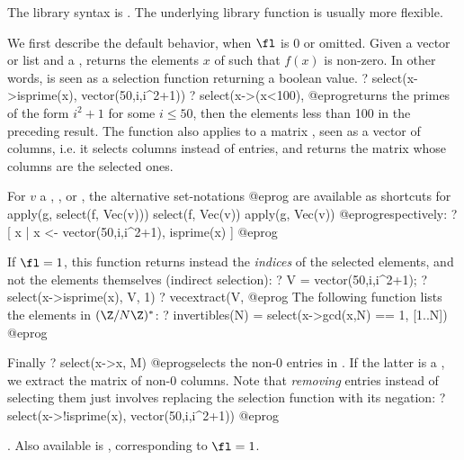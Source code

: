 The library syntax is .
The underlying library function
 is usually more flexible.

\label{se:select}
We first describe the default behavior, when $\fl$ is 0 or omitted.
Given a vector or list  and a  , 
returns the elements $x$ of  such that $f(x)$ is non-zero. In other
words,  is seen as a selection function returning a boolean value.
\bprog
? select(x->isprime(x), vector(50,i,i^2+1))
? select(x->(x<100), %
@eprog\noindent returns the primes of the form $i^2+1$ for some $i\leq 50$,
then the elements less than 100 in the preceding result. The 
function also applies to a matrix , seen as a vector of columns, i.e. it
selects columns instead of entries, and returns the matrix whose columns are
the selected ones.

 For $v$ a , ,  or ,
the alternative set-notations
\bprog
[g(x) | x <- v, f(x)]
[x | x <- v, f(x)]
[g(x) | x <- v]
@eprog\noindent
are available as shortcuts for
\bprog
apply(g, select(f, Vec(v)))
select(f, Vec(v))
apply(g, Vec(v))
@eprog\noindent respectively:
\bprog
? [ x | x <- vector(50,i,i^2+1), isprime(x) ]
@eprog

\noindent If $\fl = 1$, this function returns instead the \emph{indices} of
the selected elements, and not the elements themselves (indirect selection):
\bprog
? V = vector(50,i,i^2+1);
? select(x->isprime(x), V, 1)
? vecextract(V, %
@eprog\noindent
The following function lists the elements in $(\Z/N\Z)^*$:
\bprog
? invertibles(N) = select(x->gcd(x,N) == 1, [1..N])
@eprog

\noindent Finally
\bprog
? select(x->x, M)
@eprog\noindent selects the non-0 entries in . If the latter is a
, we extract the matrix of non-0 columns. Note that \emph{removing}
entries instead of selecting them just involves replacing the selection
function  with its negation:
\bprog
? select(x->!isprime(x), vector(50,i,i^2+1))
@eprog

. Also available
is ,
corresponding to $\fl = 1$.


